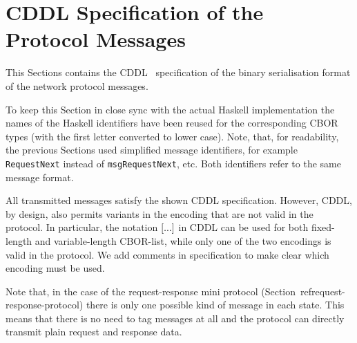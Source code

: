 \chapter{CDDL Specification of the Protocol Messages}
\label{CBOR-section}
\label{included-cddl}
This Sections contains the CDDL~\cite{cddl} specification
of the binary serialisation format of the network protocol messages.

To keep this Section in close sync with the actual Haskell implementation
the names of the Haskell identifiers have been reused for the corresponding
CBOR types (with the first letter converted to lower case).
Note, that, for readability, the previous Sections used simplified message identifiers,
for example {\tt RequestNext} instead of {\tt msgRequestNext}, etc.
Both identifiers refer to the same message format.

All transmitted messages satisfy the shown CDDL specification.
However, CDDL, by design, also permits variants in the encoding that are not valid in the protocol.
In particular, the notation ${\tt [} ... {\tt ]}$ in CDDL can be used for both fixed-length
and variable-length CBOR-list, while only one of the two encodings is valid in the protocol.
We add comments in specification to make clear which encoding must be used.

Note that, in the case of the request-response mini protocol (Section~ref{request-response-protocol})
there is only one possible kind of message in each state.  This means that
there is no need to tag messages at all and the protocol can directly transmit
plain request and response data.


